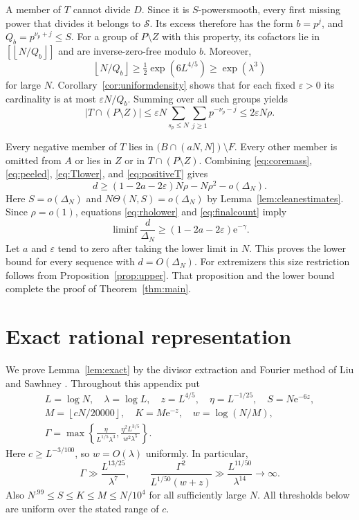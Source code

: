 \documentclass[11pt,leqno]{amsart}
\numberwithin{equation}{section}
\theoremstyle{definition}
\theoremstyle{remark}
\newcommand{\e}{\mathrm e}
\newcommand{\eps}{\varepsilon}
\newcommand{\card}[1]{\lvert #1\rvert}
\newcommand{\floor}[1]{\left\lfloor #1\right\rfloor}
\begin{document}
A member of $T$ cannot divide $D$. Since it is $S$-powersmooth, every
first missing power that divides it belongs to $\mathcal S$.
Its excess therefore has the form $b=p^j$, and
$Q_b=p^{\nu_p+j}\le S$.
For a group of $P\setminus Z$ with this property, its cofactors lie in
$[\floor{N/Q_b}]$ and are inverse-zero-free modulo $b$.
Moreover,
\[
 \floor{N/Q_b}\ge\tfrac12\exp(6L^{4/5})
 \ge\exp(\lambda^3)
\]
for large $N$. Corollary~\ref{cor:uniformdensity} shows that for each
fixed $\eps>0$ its cardinality is at most $\eps N/Q_b$.
Summing over all such groups yields
\begin{equation}\label{eq:positiveT}
 \card{T\cap(P\setminus Z)}
 \le\eps N\sum_{s_p\le N}\sum_{j\ge1}p^{-\nu_p-j}
 \le2\eps N\rho.
\end{equation}

Every negative member of $T$ lies in $(B\cap(aN,N])\setminus F$.
Every other member is omitted from $A$ or lies in $Z$ or in
$T\cap(P\setminus Z)$. Combining
\eqref{eq:coremass}, \eqref{eq:peeled}, \eqref{eq:Tlower}, and
\eqref{eq:positiveT} gives
\begin{equation}\label{eq:finalcount}
 d\ge(1-2a-2\eps)N\rho-N\rho^2-o(\Delta_N).
\end{equation}
Here $S=o(\Delta_N)$ and $N\Theta(N,S)=o(\Delta_N)$ by
Lemma~\ref{lem:cleanestimates}.
Since $\rho=o(1)$, equations \eqref{eq:rholower} and
\eqref{eq:finalcount} imply
\[
 \liminf\frac d{\Delta_N}\ge(1-2a-2\eps)\e^{-\gamma}.
\]
Let $a$ and $\eps$ tend to zero after taking the lower limit in $N$.
This proves the lower bound for every sequence with $d=O(\Delta_N)$.
For extremizers this size restriction follows from
Proposition~\ref{prop:upper}. That proposition and the lower bound
complete the proof of Theorem~\ref{thm:main}.


\appendix
\section{Exact rational representation}\label{app:representation}

We prove Lemma~\ref{lem:exact} by the divisor extraction and Fourier
method of Liu and Sawhney \cite[Section~5]{LS}.
Throughout this appendix put
\begin{gather*}
 L=\log N,\quad \lambda=\log L,\quad z=L^{4/5},\quad
 \eta=L^{-1/25},\quad S=N\e^{-6z},\\
 M=\floor{cN/20000},\quad K=M\e^{-z},\quad w=\log(N/M),\\
 \Gamma=\max\left\{\frac\eta{L^{1/5}\lambda^3},
              \frac{\eta^2L^{3/5}}{w^2\lambda^5}\right\}.
\end{gather*}
Here $c\ge L^{-3/100}$, so $w=O(\lambda)$ uniformly. In particular,
\begin{equation}\label{eq:appendixparameters}
 \Gamma\gg\frac{L^{13/25}}{\lambda^7},\qquad
 \frac{\Gamma^2}{L^{1/50}(w+z)}
 \gg\frac{L^{11/50}}{\lambda^{14}}\longrightarrow\infty.
\end{equation}
Also $N^{.99}\le S\le K\le M\le N/10^4$ for all sufficiently large
$N$. All thresholds below are uniform over the stated range of $c$.
\end{document}
